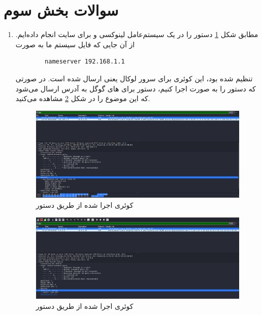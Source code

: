 \documentclass[12pt]{article}
\begin{document}
\newpage

\section{سوالات بخش سوم}

\begin{enumerate}
	\item
مطابق شکل \ref{s10} دستور را در یک سیستم‌عامل لینوکسی و برای سایت 
انجام داده‌ایم. از آن جایی که فایل
سیستم ما به صورت 

\begin{latin}
	\begin{verbatim}
		nameserver 192.168.1.1
	\end{verbatim}
\end{latin}

تنظیم شده بود، این کوئری برای  سرور لوکال یعنی
ارسال شده است. در صورتی که دستور را به صورت
اجرا کنیم، دستور برای  های گوگل به آدرس
ارسال می‌شود که این موضوع را در شکل \ref{s11} مشاهده می‌کنید.


	\begin{figure}[H]
	\centering
	\includegraphics[scale=0.25]{images/10.png}
	\caption{کوئری  اجرا شده از طریق دستور
	} 
	\label{s10}
\end{figure}


	\begin{figure}[H]
	\centering
	\includegraphics[scale=0.25]{images/12.png}
	\caption{کوئری  اجرا شده از طریق دستور
		} 
	\label{s11}
\end{figure}


\end{enumerate}
\end{document}
